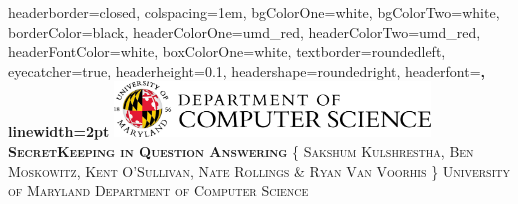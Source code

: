 \documentclass[landscape,a0paper,fontscale=0.285]{baposter} %
\begin{document}
\begin{poster}
{
headerborder=closed, %
colspacing=1em, %
bgColorOne=white, %
bgColorTwo=white, %
borderColor=black, %
headerColorOne=umd_red, %
headerColorTwo=umd_red, %
headerFontColor=white, %
boxColorOne=white, %
textborder=roundedleft, %
eyecatcher=true, %
headerheight=0.1\textheight, %
headershape=roundedright, %
headerfont=\Large\bf\textsc, %
linewidth=2pt %
}
%
{\includegraphics[height=4em]{umd_logo.png}} %
{\bf\textsc{SecretKeeping in Question Answering}\vspace{0.5em}} %
{\textsc{\{ Sakshum Kulshrestha, Ben Moskowitz, Kent O'Sullivan, Nate Rollings \& Ryan Van Voorhis \} \hspace{12pt} University of Maryland Department of Computer Science}} %



\end{poster}
\end{document}
